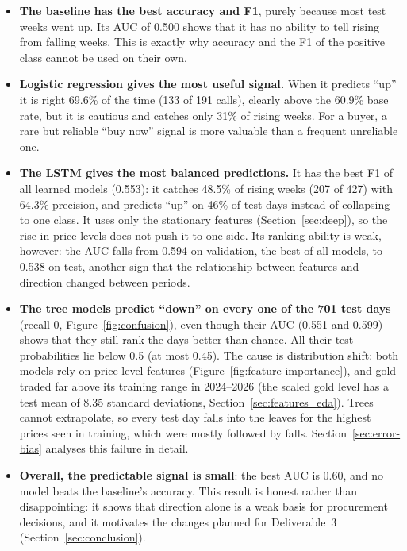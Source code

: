 \begin{itemize}
  \item \textbf{The baseline has the best accuracy and F1}, purely because most
        test weeks went up. Its AUC of 0.500 shows that it has no ability to
        tell rising from falling weeks. This is exactly why accuracy and the
        F1 of the positive class cannot be used on their own.
  \item \textbf{Logistic regression gives the most useful signal.} When it
        predicts ``up'' it is right 69.6\% of the time (133 of 191 calls),
        clearly above the 60.9\% base rate, but it is cautious and catches only
        31\% of rising weeks. For a buyer, a rare but reliable ``buy now''
        signal is more valuable than a frequent unreliable one.
  \item \textbf{The LSTM gives the most balanced predictions.} It has the
        best F1 of all learned models (0.553): it catches 48.5\% of rising
        weeks (207 of 427) with 64.3\% precision, and predicts ``up'' on 46\%
        of test days instead of collapsing to one class. It uses only the
        stationary features (Section~\ref{sec:deep}), so the rise in price
        levels does not push it to one side. Its ranking ability is weak,
        however: the AUC falls from 0.594 on validation, the best of all
        models, to 0.538 on test, another sign that the relationship between
        features and direction changed between periods.
  \item \textbf{The tree models predict ``down'' on every one of the 701 test
        days} (recall 0, Figure~\ref{fig:confusion}), even though their AUC
        (0.551 and 0.599) shows that they still rank the days better than
        chance. All their test probabilities lie below 0.5 (at most 0.45). The
        cause is distribution shift: both models rely on price-level features
        (Figure~\ref{fig:feature-importance}), and gold traded far above its
        training range in 2024--2026 (the scaled gold level has a test mean of
        8.35 standard deviations, Section~\ref{sec:features_eda}). Trees cannot
        extrapolate, so every test day falls into the leaves for the highest
        prices seen in training, which were mostly followed by falls.
        Section~\ref{sec:error-bias} analyses this failure in detail.
  \item \textbf{Overall, the predictable signal is small}: the best AUC is
        0.60, and no model beats the baseline's accuracy. This result is
        honest rather than disappointing: it shows that direction alone is a
        weak basis for procurement decisions, and it motivates the changes
        planned for Deliverable~3 (Section~\ref{sec:conclusion}).
\end{itemize}